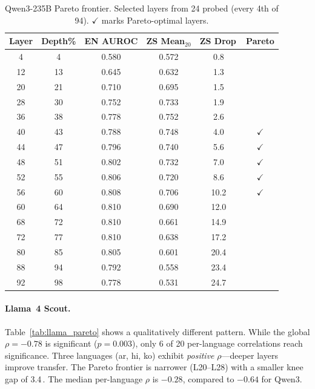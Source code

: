 \documentclass[11pt,a4paper]{article}
\newcommand{\pp}{\,\text{pp}}
\begin{document}
\begin{table}[t]
\centering
\caption{Qwen3-235B Pareto frontier. Selected layers from 24 probed (every 4th of 94). $\checkmark$ marks Pareto-optimal layers.}
\label{tab:qwen_pareto}
\small
\begin{tabular}{cccccc}
\toprule
Layer & Depth\% & EN AUROC & ZS Mean$_{20}$ & ZS Drop\pp & Pareto \\
\midrule
4  & 4  & 0.580 & 0.572 & 0.8  & \\
12 & 13 & 0.645 & 0.632 & 1.3  & \\
20 & 21 & 0.710 & 0.695 & 1.5  & \\
28 & 30 & 0.752 & 0.733 & 1.9  & \\
36 & 38 & 0.778 & 0.752 & 2.6  & \\
40 & 43 & 0.788 & 0.748 & 4.0  & $\checkmark$ \\
44 & 47 & 0.796 & 0.740 & 5.6  & $\checkmark$ \\
48 & 51 & 0.802 & 0.732 & 7.0  & $\checkmark$ \\
52 & 55 & 0.806 & 0.720 & 8.6  & $\checkmark$ \\
56 & 60 & 0.808 & 0.706 & 10.2 & $\checkmark$ \\
60 & 64 & 0.810 & 0.690 & 12.0 & \\
68 & 72 & 0.810 & 0.661 & 14.9 & \\
72 & 77 & 0.810 & 0.638 & 17.2 & \\
80 & 85 & 0.805 & 0.601 & 20.4 & \\
88 & 94 & 0.792 & 0.558 & 23.4 & \\
92 & 98 & 0.778 & 0.531 & 24.7 & \\
\bottomrule
\end{tabular}
\end{table}

\paragraph{Llama~4 Scout.}
Table~\ref{tab:llama_pareto} shows a qualitatively different pattern. While the global $\rho = -0.78$ is significant ($p = 0.003$), only 6 of 20 per-language correlations reach significance. Three languages (ar, hi, ko) exhibit \emph{positive} $\rho$---deeper layers improve transfer. The Pareto frontier is narrower (L20--L28) with a smaller knee gap of 3.4\pp. The median per-language $\rho$ is $-0.28$, compared to $-0.64$ for Qwen3.
\end{document}
